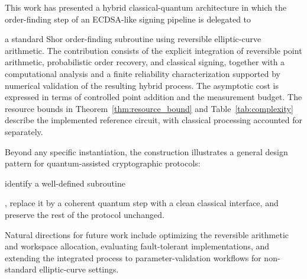 This work has presented a hybrid classical-quantum architecture in which the order-finding step of an ECDSA-like signing pipeline is delegated to \begin{revision} a standard Shor order-finding subroutine using reversible elliptic-curve arithmetic. The contribution consists of the explicit integration of reversible point arithmetic, probabilistic order recovery, and classical signing, together with a computational analysis and a finite reliability characterization supported by numerical validation of the resulting hybrid process. The asymptotic cost is expressed in terms of controlled point addition and the measurement budget. The resource bounds in Theorem~\ref{thm:resource_bound} and Table~\ref{tab:complexity} describe the implemented reference circuit, with classical processing accounted for separately.\end{revision} Beyond any specific instantiation, the construction illustrates a general design pattern for quantum-assisted cryptographic protocols: \begin{revision}identify a well-defined subroutine\end{revision}, replace it by a coherent quantum step with a clean classical interface, and preserve the rest of the protocol unchanged. \begin{revision} Natural directions for future work include optimizing the reversible arithmetic and workspace allocation, evaluating fault-tolerant implementations, and extending the integrated process to parameter-validation workflows for non-standard elliptic-curve settings.
\end{revision}
